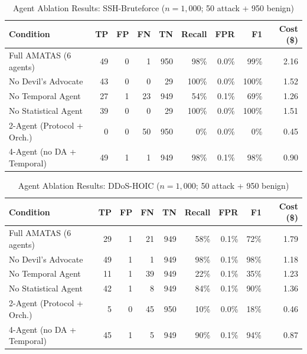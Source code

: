 \begin{table}[H]
\centering
\caption{Agent Ablation Results: SSH-Bruteforce ($n = 1{,}000$; 50 attack + 950 benign)}
\label{tab:ablation-ssh}
\small
\begin{tabular}{@{}l r r r r r r r r@{}}
\toprule
Condition & TP & FP & FN & TN & Recall & FPR & F1 & Cost (\$) \\
\midrule
Full AMATAS (6 agents) & 49 & 0 & 1 & 950 & 98\% & 0.0\% & 99\% & 2.16 \\
No Devil's Advocate & 43 & 0 & 0 & 29 & 100\% & 0.0\% & 100\% & 1.52 \\
No Temporal Agent & 27 & 1 & 23 & 949 & 54\% & 0.1\% & 69\% & 1.26 \\
No Statistical Agent & 39 & 0 & 0 & 29 & 100\% & 0.0\% & 100\% & 1.51 \\
2-Agent (Protocol + Orch.) & 0 & 0 & 50 & 950 & 0\% & 0.0\% & 0\% & 0.45 \\
4-Agent (no DA + Temporal) & 49 & 1 & 1 & 949 & 98\% & 0.1\% & 98\% & 0.90 \\
\bottomrule
\end{tabular}
\end{table}

\begin{table}[H]
\centering
\caption{Agent Ablation Results: DDoS-HOIC ($n = 1{,}000$; 50 attack + 950 benign)}
\label{tab:ablation-hoic}
\small
\begin{tabular}{@{}l r r r r r r r r@{}}
\toprule
Condition & TP & FP & FN & TN & Recall & FPR & F1 & Cost (\$) \\
\midrule
Full AMATAS (6 agents) & 29 & 1 & 21 & 949 & 58\% & 0.1\% & 72\% & 1.79 \\
No Devil's Advocate & 49 & 1 & 1 & 949 & 98\% & 0.1\% & 98\% & 1.18 \\
No Temporal Agent & 11 & 1 & 39 & 949 & 22\% & 0.1\% & 35\% & 1.23 \\
No Statistical Agent & 42 & 1 & 8 & 949 & 84\% & 0.1\% & 90\% & 1.36 \\
2-Agent (Protocol + Orch.) & 5 & 0 & 45 & 950 & 10\% & 0.0\% & 18\% & 0.46 \\
4-Agent (no DA + Temporal) & 45 & 1 & 5 & 949 & 90\% & 0.1\% & 94\% & 0.87 \\
\bottomrule
\end{tabular}
\end{table}

